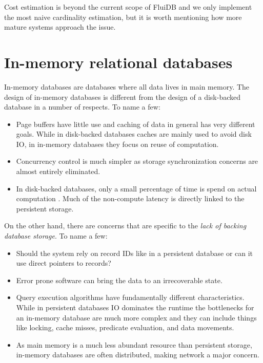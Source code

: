 Cost estimation is beyond the current scope of FluiDB and we only
implement the most naive cardinality estimation, but it is worth
mentioning how more mature systems approach the issue.

\section{In-memory relational databases}

In-memory databases are databases where all data lives in main
memory. The design of in-memory databases is different from the design
of a disk-backed database in a number of respects. To name a few:

\begin{itemize}
\item Page buffers have little use and caching of data in general has very
different goals. While in disk-backed databases caches are mainly used to
avoid disk IO, in in-memory databases they focus on reuse of computation.
\item Concurrency control is much simpler as storage synchronization
concerns are almost entirely eliminated.
\item In disk-backed databases, only a small percentage of time is spend on
actual computation \cite{harizopoulosOLTPLookingGlass2018}. Much of
the non-compute latency is directly linked to the persistent
storage.
\end{itemize}

On the other hand, there are concerns that are specific to the
\emph{lack of backing database storage}. To name a few:

\begin{itemize}
\item Should the system rely on record IDs like in a persistent database
or can it use direct pointers to records?
\item Error prone software can bring the data to an irrecoverable state.
\item Query execution algorithms have fundamentally different
characteristics. While in persistent databases IO dominates the
runtime the bottlenecks for an in-memory database are much more
complex and they can include things like locking, cache misses,
predicate evaluation, and data movements.
\item As main memory is a much less abundant resource than persistent
storage, in-memory databases are often distributed, making network a
major concern.
\end{itemize}

